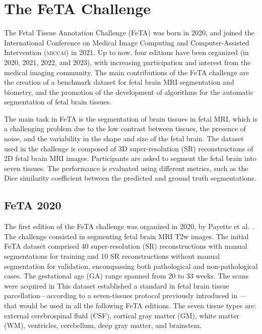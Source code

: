 \chapter{The FeTA Challenge} \label{chap:TheFeTAChallenge}
\vspace{1cm}

The Fetal Tissue Annotation Challenge (FeTA) \cite{FeTA2024} was born in 2020, and joined the International Conference on Medical Image Computing and Computer-Assisted Intervention (\textsc{miccai}) \cite{MICCAI} in 2021. Up to now, four editions have been organized (in 2020, 2021, 2022, and 2023), with increasing participation and interest from the medical imaging community. The main contributions of the FeTA challenge are the creation of a benchmark dataset for fetal brain MRI segmentation and biometry, and the promotion of the development of algorithms for the automatic segmentation of fetal brain tissues.

The main task in FeTA is the segmentation of brain tissues in fetal MRI, which is a challenging problem due to the low contrast between tissues, the presence of noise, and the variability in the shape and size of the fetal brain. The dataset used in the challenge is composed of 3D super-resolution (SR) reconstructions of 2D fetal brain MRI images. Participants are asked to segment the fetal brain into seven tissues. The performance is evaluated using different metrics, such as the Dice similarity coefficient between the predicted and ground truth segmentations. \cite{FeTA2024_paper}

\section{FeTA 2020}

The first edition of the FeTA challenge was organized in 2020, by Payette et al.\ \cite{FeTA2020_review}. The challenge consisted in segmenting fetal brain MRI T2w images. The initial FeTA dataset comprised 40 super-resolution (SR) reconstructions with manual segmentations for training and 10 SR reconstructions without manual segmentation for validation, encompassing both pathological and non-pathological cases. The gestational age (GA) range spanned from 20 to 33 weeks. The scans were acquired in This dataset established a standard in fetal brain tissue parcellation---according to a seven-tissues protocol previously introduced in \cite{Payette2020}---that would be used in all the following FeTA editions. The seven tissue types are: external cerebrospinal fluid (CSF), cortical gray matter (GM), white matter (WM), ventricles, cerebellum, deep gray matter, and brainstem.

